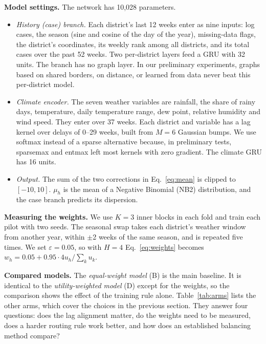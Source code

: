 \documentclass[conference]{IEEEtran}
\begin{document}
\textbf{Model settings.} The network has 10,028 parameters.
\begin{itemize}
\item \emph{History (case) branch.} Each district's last 12 weeks enter as nine inputs: log cases, the season (sine and cosine of the day of the year), missing-data flags, the district's coordinates, its weekly rank among all districts, and its total cases over the past 52 weeks. Two per-district layers feed a GRU with 32 units. The branch has no graph layer. In our preliminary experiments, graphs based on shared borders, on distance, or learned from data never beat this per-district model.
\item \emph{Climate encoder.} The seven weather variables are rainfall, the share of rainy days, temperature, daily temperature range, dew point, relative humidity and wind speed. They enter over 37 weeks. Each district and variable has a lag kernel over delays of 0--29 weeks, built from $M = 6$ Gaussian bumps. We use softmax instead of a sparse alternative because, in preliminary tests, sparsemax and entmax left most kernels with zero gradient. The climate GRU has 16 units.
\item \emph{Output.} The sum of the two corrections in Eq.~\eqref{eq:mean} is clipped to $[-10, 10]$. $\mu_h$ is the mean of a Negative Binomial (NB2) distribution, and the case branch predicts its dispersion.
\end{itemize}

\textbf{Measuring the weights.} We use $K = 3$ inner blocks in each fold and train each pilot with two seeds. The seasonal swap takes each district's weather window from another year, within $\pm$2 weeks of the same season, and is repeated five times. We set $\varepsilon = 0.05$, so with $H = 4$ Eq.~\eqref{eq:weights} becomes $w_h = 0.05 + 0.95 \cdot 4u_h / \sum_k u_k$.

\textbf{Compared models.} The \emph{equal-weight model} (B) is the main baseline. It is identical to the \emph{utility-weighted model} (D) except for the weights, so the comparison shows the effect of the training rule alone. Table~\ref{tab:arms} lists the other arms, which cover the choices in the previous section. They answer four questions: does the lag alignment matter, do the weights need to be measured, does a harder routing rule work better, and how does an established balancing method compare?
\end{document}
